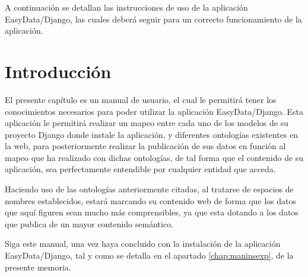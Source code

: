 

A continuación se detallan las instrucciones de uso de la aplicación
EasyData/Django, las cuales deberá seguir para un correcto funcionamiento de la
aplicación.


\section{Introducción}

El presente capítulo es un manual de usuario, el cual le permitirá tener los
conocimientos necesarios para poder utilizar la aplicación EasyData/Django. Esta
aplicación le permitirá realizar un mapeo entre cada uno de los modelos de su
proyecto Django donde instale la aplicación, y diferentes ontologías existentes
en la web, para posteriormente realizar la publicación de sus datos en función
al mapeo que ha realizado con dichas ontologías, de tal forma que el contenido
de su aplicación, sea perfectamente entendible por cualquier entidad que acceda.

Haciendo uso de las ontologías anteriormente citadas, al tratarse de espacios de
nombres establecidos, estará marcando su contenido web de forma que los datos
que aquí figuren sean mucho más comprensibles, ya que esta dotando a los datos
que publica de un mayor contenido semántico.

Siga este manual, una vez haya concluido con la instalación de la aplicación
EasyData/Django, tal y como se detalla en el apartado \ref{chap:maninsexp}, de
la presente memoria.


